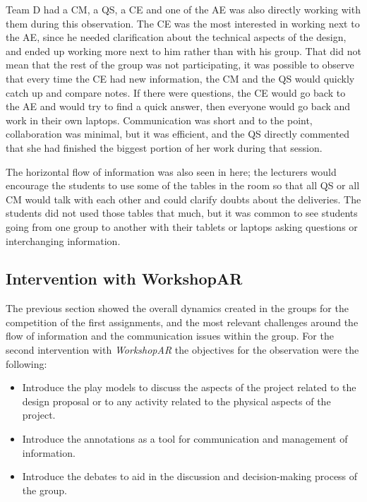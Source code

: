 Team D had a \ac{CM}, a \ac{QS}, a \ac{CE} and one of the \ac{AE} was also directly working with them during this observation. The \ac{CE} was the most interested in
working next to the \ac{AE}, since he needed clarification about the technical aspects of the design, and ended up working more next to him rather than with his group. That
did not mean that the rest of the group was not participating, it was possible to observe that every time the \ac{CE} had new information, the \ac{CM} and the \ac{QS} would
quickly catch up and compare notes. If there were questions, the \ac{CE} would go back to the \ac{AE} and would try to find a quick answer, then everyone would go back and
work in their own laptops. Communication was short and to the point, collaboration was minimal, but it was efficient, and the \ac{QS} directly commented that she had
finished the biggest portion of her work during that session.

The horizontal flow of information was also seen in here; the lecturers would encourage the students to use some of the tables in the room so that all \ac{QS} or all
\ac{CM} would talk with each other and could clarify doubts about the deliveries. The students did not used those tables that much, but it was common to see students going
from one group to another with their tablets or laptops asking questions or interchanging information.

\subsection{Intervention with WorkshopAR \label{sec:6-5-2}}

The previous section showed the overall dynamics created in the groups for the competition of the first assignments, and the most relevant challenges around the flow of
information and the communication issues within the group. For the second intervention with \emph{WorkshopAR} the objectives for the observation were the following:

\begin{itemize}
    \item Introduce the play models to discuss the aspects of the project related to the design proposal or to any activity related to the physical aspects of the project.
    \item Introduce the annotations as a tool for communication and management of information.
    \item Introduce the debates to aid in the discussion and decision-making process of the group.
\end{itemize}

